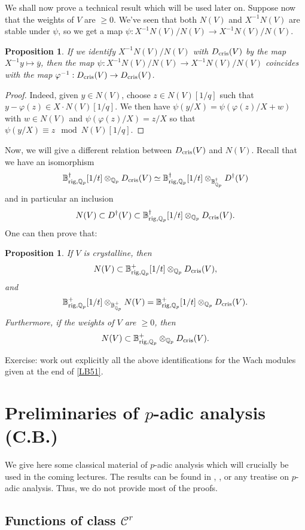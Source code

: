 \documentclass[11pt]{amsart}
\def\Q{{\mathbb Q}_p}
\def\ra{\rightarrow}
\def\bplus{\mathbb{B}^+}
\newcommand{\bdag}[1]{\mathbb{B}^{\dagger #1}}
\newcommand{\bhol}[1]{\mathbb{B}^+_{\mathrm{rig} #1}}
\newcommand{\bnrig}[2]{\mathbb{B}^{\dagger #1}_{\mathrm{rig} #2}}
\def\dcris{D_{\rm cris}}
\renewcommand{\ddag}[1]{D^{\dagger #1}}
\newtheorem{prop}[definit]{\bf{Proposition}}
\begin{document}
We shall now prove a technical result which will be used later 
on. Suppose now that the weights of $V$ are $\geq 0$. We've seen that 
both $N(V)$ and $X^{-1} N(V)$ are stable under $\psi$, so we get a map 
$\psi: X^{-1} N(V) / N(V) \ra X^{-1} N(V) / N(V)$.  
\begin{prop}\label{psidcris} 
If we identify 
$X^{-1} N(V) / N(V)$ with $\dcris(V)$ by  
the map $X^{-1} y \mapsto 
\overline{y}$, then the map  
$\psi: X^{-1} N(V) / N(V) \ra X^{-1} N(V) / N(V)$ 
coincides with the map $\varphi^{-1} : \dcris(V) \ra \dcris(V)$.  
\end{prop} 
 
\begin{proof} 
Indeed, given $y \in N(V)$, choose $z \in N(V)[1/q]$ such that $y-\varphi(z) \in 
X \cdot N(V)[1/q]$. We then have $\psi(y/X)=\psi(\varphi(z)/X+w)$ with $w 
\in N(V)$ and $\psi(\varphi(z)/X)=z/X$ so that $\psi(y/X)\equiv z 
\mod{N(V)[1/q]}$.  
\end{proof} 
 
Now, we will give a different relation between $\dcris(V)$ and 
$N(V)$. Recall that we have an isomorphism 
\[ \bnrig{}{,\Q}[1/t] \otimes_{\Q} \dcris(V) \simeq \bnrig{}{,\Q}[1/t] 
\otimes_{\bdag{}_{\Q}} \ddag{}(V) \]  and in particular an inclusion 
\[ N(V) \subset \ddag{}(V) \subset \bnrig{}{,\Q}[1/t] \otimes_{\Q} \dcris(V). \]  
One can then prove that: 

\begin{prop}\label{inccris}\label{groumpf} 
If $V$ is crystalline, then 
\[ N(V) \subset \bhol{,\Q}[1/t] \otimes_{\Q} \dcris(V), \] 
and \[ \bhol{,\Q}[1/t] \otimes_{\bplus_{\Q}} N(V) 
= \bhol{,\Q}[1/t] \otimes_{\Q} \dcris(V). \]
Furthermore, if the weights of $V$ are $\geq 0$, then  
\[ N(V) \subset \bhol{,\Q} \otimes_{\Q} \dcris(V). \] 
\end{prop} 
 
Exercise: work out explicitly all the above identifications for the 
Wach modules given at the end of \ref{LB51}.  
 
\section{Preliminaries of $p$-adic analysis (C.B.)} 
We give here some classical material of $p$-adic analysis which will
crucially be used in the coming lectures. The results can be found in
\cite{Schi}, \cite{Co1}, \cite{Schi2} or any treatise on $p$-adic
analysis. Thus, we do not provide most of the proofs. 
 
\subsection{Functions of class ${\mathcal C}^r$}\label{c^r} 
 
\end{document}
